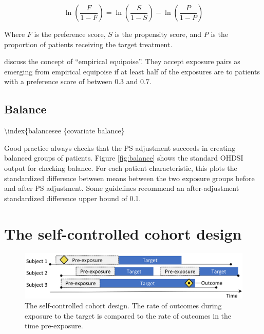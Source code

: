 \documentclass[11pt]{book}
\theoremstyle{definition}
\theoremstyle{definition}
\theoremstyle{definition}
\theoremstyle{remark}
\begin{document}
\[\ln\left(\frac{F}{1-F}\right)=\ln\left(\frac{S}{1-S}\right)-\ln\left(\frac{P}{1-P}\right)\]

Where \(F\) is the preference score, \(S\) is the propensity score, and \(P\) is the proportion of patients receiving the target treatment.

\citet{walker_2013} discuss the concept of ``empirical equipoise''. They accept exposure pairs as emerging from empirical equipoise if at least half of the exposures are to patients with a preference score of between 0.3 and 0.7. 

\hypertarget{balance}{%
\subsection{Balance}\label{balance}}

 \textbackslash index\{balance\textbar see \{covariate balance\}

Good practice always checks that the PS adjustment succeeds in creating balanced groups of patients. Figure \ref{fig:balance} shows the standard OHDSI output for checking balance. For each patient characteristic, this plots the standardized difference between means between the two exposure groups before and after PS adjustment. Some guidelines recommend an after-adjustment standardized difference upper bound of 0.1. \citep{rubin_2001}

\hypertarget{the-self-controlled-cohort-design}{%
\section{The self-controlled cohort design}\label{the-self-controlled-cohort-design}}


\begin{figure}

{\centering \includegraphics[width=0.9\linewidth]{images/PopulationLevelEstimation/selfControlledCohort} 

}

\caption{The self-controlled cohort design. The rate of outcomes during exposure to the target is compared to the rate of outcomes in the time pre-exposure.}\label{fig:scc}
\end{figure}
\end{document}
